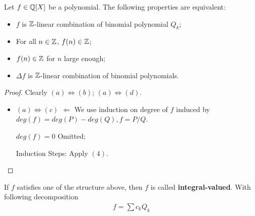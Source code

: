 \documentclass[Total.tex]{subfiles}
\begin{document}
				\begin{proposition}
					Let $f\in \mathbb{Q}[X]$ be a polynomial. The following properties are equivalent:
					\begin{itemize}
						\item $f$ is $\mathbb{Z}$-linear combination of binomial polynomial $Q_k$;
						\item For all $n\in \mathbb{Z}$, $f(n)\in \mathbb{Z}$;
						\item $f(n)\in \mathbb{Z}$ for $n$ large enough;
						\item $\Delta f$ is $\mathbb{Z}$-linear combination of binomial polynomials.
					\end{itemize}
				\end{proposition}
				\begin{proof}
					Clearly $(a)\Leftrightarrow (b)$; $(a)\Leftrightarrow (d)$.
					
					\begin{itemize}
						\item $(a)\Leftrightarrow (c)$ $\Leftarrow$ We use induction on degree of $f$ induced by $deg(f)=deg(P)-deg(Q),f=P/Q$. 
						
						$deg(f)=0$ Omitted;
						
						Induction Steps: Apply $(4)$.
					\end{itemize}
				\end{proof}
				\begin{Def}
					If $f$ satisfies one of the structure above, then $f$ is called \textbf{integral-valued}. With following decomposition
					\begin{gather*}
						f=\sum c_k Q_k
					\end{gather*}
				\end{Def}
\end{document}
